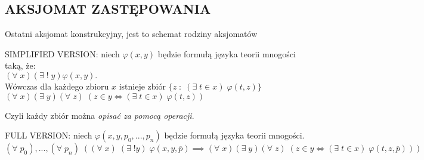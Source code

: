 \documentclass{article}
\begin{document}
\subsection{AKSJOMAT ZASTĘPOWANIA}
Ostatni aksjomat konstrukcyjny, jest to schemat rodziny aksjomatów\smallskip\\
\begin{center}\large
    {\color{def}SIMPLIFIED VERSION:} niech $\varphi(x, y)$ będzie formułą języka teorii mnogości taką, że:\smallskip\\
    $(\forall\;x)(\exists\;!\;y)\varphi(x, y).$\smallskip\\
    Wówczas dla każdego zbioru $x$ istnieje zbiór $\{z\;:\;(\exists\;t\in x)\;\varphi(t, z)\}$\smallskip\\
    $(\forall\;x)(\exists\;y)(\forall\;z)\;(z\in y\iff (\exists\;t\in x)\;\varphi(t, z))$
\end{center}\medskip
Czyli każdy zbiór można \emph{\color{acc}opisać za pomocą operacji}.\bigskip\\
\begin{center}\large
    {\color{def}FULL VERSION:} niech $\varphi(x, y, p_0, ..., p_n)$ będzie formułą języka teorii mnogości. \smallskip\\
    $(\forall\;p_0), ..., (\forall\;p_n)\;((\forall\;x)\;(\exists\;!y)\;\varphi(x, y, \overline p)\implies (\forall\;x)(\exists\;y)(\forall\;z)\;(z\in y\iff (\exists\;t\in x)\;\varphi(t, z, \overline p)))$
\end{center}
\end{document}
